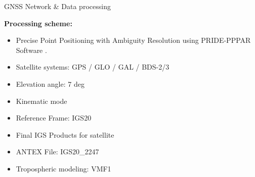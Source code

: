 \documentclass[final,a0,portrait]{beamer}
\newlength{\onecolwid}
\begin{document}
\begin{frame}[t]
\begin{columns}[t]
\begin{column}{\onecolwid}
\begin{block}{GNSS Network \& Data processing}
{\textbf{Processing scheme:}
\begin{itemize}\setlength\itemsep{.3em}
  \item Precise Point Positioning with Ambiguity Resolution using PRIDE-PPPAR Software \cite{Geng_2019}.
  \item Satellite systems: GPS / GLO / GAL / BDS-2/3
  \item Elevation angle: 7 deg
  \item Kinematic mode
  \item Reference Frame: IGS20
  \item Final IGS Products for satellite
  \item ANTEX File: IGS20\_2247
  \item Tropospheric modeling: VMF1
\end{itemize}

%
%
%
%
%
%
%
%
%
%
%
%
%
}


\end{block}
\end{column}
\end{columns}
\end{frame}
\end{document}
